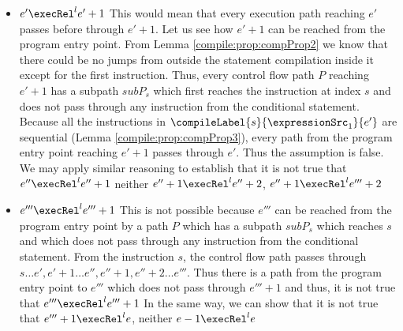\begin{description}
 \begin{itemize}
       \item  $e' \execRel^{l} e'+1 $ This would mean that every execution path reaching $e'$ passes before through $e'+1$.
             Let us see how $e'+1$ can be reached from the program entry point.
             From Lemma \ref{compile:prop:compProp2} we know that there could be no jumps from outside the statement compilation inside it 
	     except for the first instruction. Thus, every control flow path $P$ reaching $e'+1$ has a subpath $subP_s$ which first 
	     reaches the instruction at index $s$ and does not pass through any instruction from the conditional statement.
	      Because all the instructions in $\compileLabel{s}{\expressionSrc_1}{e'}$ are sequential (Lemma \ref{compile:prop:compProp3}), every path from the 
	     program entry point reaching $e'+1$ passes through $e'$. Thus the assumption is false.
	     We may apply similar reasoning to establish that it is not true that  $e'' \execRel^{l} e''+1 $ neither $e''+ 1 \execRel^{l} e''+2$, 
	     $e'' + 1 \execRel^{l} e'''+2 $

      
      \item $e''' \execRel^{l} e'''+1$ This is not possible because $e'''$ can be reached from the program entry point by a path $P $ which has 
           a subpath $subP_s$ which reaches $s$ and which does not pass through any instruction from the conditional statement.
	   From the instruction $s$, the control flow path 
	   passes through $s \ldots e', e' +1 \ldots e'', e''+1, e''+2\ldots e''' $. Thus there is a path from the 
	   program entry point to  $e'''$ which does not pass through $e'''+1$ and thus, it is not true  that $e''' \execRel^{l} e'''+1$
	   In the same way, we can show that it is not true that  $e''' + 1 \execRel^{l} e$, neither $ e -1 \execRel^{l} e  $
	       
 \end{itemize}

\end{description}
\Qed\\


